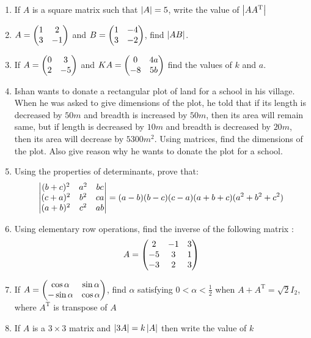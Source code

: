 \begin{enumerate}
	\item If $A$ is a square matrix such that $\left\vert A\right\vert = 5$, write the value of 
$\left\vert AA^{\text{T}}\right\vert$

	\item $A = \begin{pmatrix}1 & 2 \\ 3 & -1\end{pmatrix}$ and $B = \begin{pmatrix}1 & -4 \\ 3 & -2\end{pmatrix}$, find $\left\vert AB\right\vert$.

	\item If $A = \begin{pmatrix}0 & 3 \\ 2 & -5\end{pmatrix}$ and $KA = \begin{pmatrix}0 & 4a \\ -8 & 5b\end{pmatrix}$ find the values of $k$ and $a$.

	\item Ishan wants to donate a rectangular plot of land for a school in his village. When he was asked to give dimensions of the plot, he told that if its length is decreased by $50m$ and breadth is increased by $50m$, then its area will remain same, but if length is decreased by $10m$ and breadth is decreased by $20m$, then its area will decrease by $5300m^2$. Using matrices, find the dimensions of the plot. Also give reason why he wants to donate the plot for a school.

	\item Using the properties of determinants, prove that:
	\begin{align*}
		\begin{vmatrix}(b+c)^2 & a^2 & bc \\
		(c+a)^2 & b^2 & ca\\
		(a+b)^2 & c^2 & ab\end{vmatrix} = (a - b) (b-c) (c-a) (a+b+c) (a^2 + b^2 + c^2)
	\end{align*}
	
	\item Using elementary row operations, find the inverse of the following matrix :
	\begin{align*}
		A = \begin{pmatrix}2 & -1 & 3\\
		-5 & 3 & 1 \\
		-3 & 2 & 3\end{pmatrix}
	\end{align*}



	\item If $A = \begin{pmatrix}\cos \alpha & \sin \alpha\\ -\sin \alpha & \cos \alpha\end{pmatrix}$, find $\alpha$ satisfying $0<\alpha<\frac{1}{2}$ when $A + A^{\text{T}} = \sqrt{2}I_{2}$, where $A^{\text{T}}$ is transpose of $A$

	\item If $A$ is a $3\times3$ matrix and $\left\vert3A\right\vert = k \left\vert A\right\vert$ then write the value of $k$


\end{enumerate}
